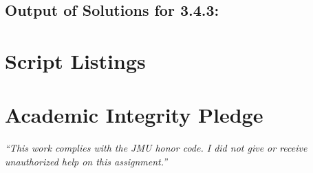 \documentclass{article}
\begin{document}
\subsection*{Output of Solutions for 3.4.3:}


\section*{Script Listings}



\vfill
  \section*{Academic Integrity Pledge}
    {\color{red}\textit{“This work complies with the JMU honor code. I did not give or receive unauthorized help on this assignment.”}}
\end{document}
